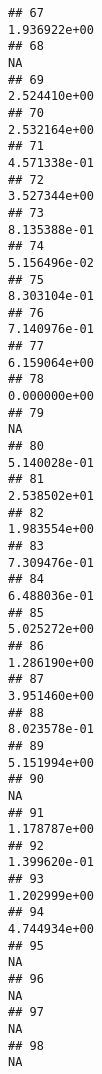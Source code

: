 \documentclass[
]{article}
\begin{document}
\begin{verbatim}
## 67                                                                1.936922e+00
## 68                                                                          NA
## 69                                                                2.524410e+00
## 70                                                                2.532164e+00
## 71                                                                4.571338e-01
## 72                                                                3.527344e+00
## 73                                                                8.135388e-01
## 74                                                                5.156496e-02
## 75                                                                8.303104e-01
## 76                                                                7.140976e-01
## 77                                                                6.159064e+00
## 78                                                                0.000000e+00
## 79                                                                          NA
## 80                                                                5.140028e-01
## 81                                                                2.538502e+01
## 82                                                                1.983554e+00
## 83                                                                7.309476e-01
## 84                                                                6.488036e-01
## 85                                                                5.025272e+00
## 86                                                                1.286190e+00
## 87                                                                3.951460e+00
## 88                                                                8.023578e-01
## 89                                                                5.151994e+00
## 90                                                                          NA
## 91                                                                1.178787e+00
## 92                                                                1.399620e-01
## 93                                                                1.202999e+00
## 94                                                                4.744934e+00
## 95                                                                          NA
## 96                                                                          NA
## 97                                                                          NA
## 98                                                                          NA

\end{verbatim}
\end{document}
